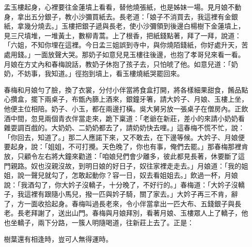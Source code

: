 孟玉樓起身，心裡要往金蓮墳上看看，替他燒張紙，也是姊妹一場。見月娘不動身，拿出五分銀子，教小沙彌買紙去。長老道：「娘子不消買去，我這裡有金銀紙，拿幾分燒去。」玉樓把銀子遞與長老，使小沙彌領到後邊白楊樹下金蓮墳上，見三尺墳堆，一堆黃土，數柳青蒿。上了根香，把紙錢點著，拜了一拜，說道：「六姐，不知你埋在這裡。今日孟三姐誤到寺中，與你燒陌錢紙，你好處升天，苦處用錢。」一面放聲大哭。那奶子如意兒見玉樓往後邊，也抱了孝哥兒來看一看。月娘在方丈內和春梅說話，教奶子休抱了孩子去，只怕唬了他。如意兒道：「奶奶，不妨事，我知道。」徑抱到墳上，看玉樓燒紙哭罷回來。

春梅和月娘勻了臉，換了衣裳，分付小伴當將食盒打開，將各樣細果甜食，餚品點心攢盒，擺下兩桌子，布甑內篩上酒來，銀鐘牙箸，請大妗子、月娘、玉樓上坐，他便主位相陪。奶子、小玉，都在兩邊打橫。吳大舅另放一張桌子在僧房內。正飲酒中間，忽見兩個青衣伴當走來，跪下稟道：「老爺在新莊，差小的來請小奶奶看雜耍調百戲的。大奶奶、二奶奶都去了，請奶奶快去哩。」這春梅不慌不忙，說：「你回去，知道了。」那二人應諾下來，又不敢去，在下邊等候。大妗子、月娘便要起身，說：「姐姐，不可打攪。天色晚了，你也有事，俺們去罷。」那春梅那裡肯放，只顧令左右將大鐘來勸道：「咱娘兒們會少離多，彼此都見長著，休要斷了這門親路。奴也沒親沒故，到明日娘的好日子，奴往家裡走走去。」月娘道：「我的姐姐，說一聲兒就勾了，怎敢起動你？容一日，奴去看姐姐去。」飲過一杯，月娘說：「我酒勾了，你大妗子沒轎子，十分晚了，不好行的。」春梅道：「大妗子沒轎子，我這裡有跟隨小馬兒，撥一匹與妗子騎，關了家去。」大妗子再三不肯，辭了，方一面收拾起身。春梅叫過長老來，令小伴當拿出一匹大布、五錢銀子與長老。長老拜謝了，送出山門。春梅與月娘拜別，看著月娘、玉樓眾人上了轎子，他也坐轎子，兩下分路，一簇人明隨喝道，往新莊上去了。正是：

樹葉還有相逢時，豈可人無得運時。

